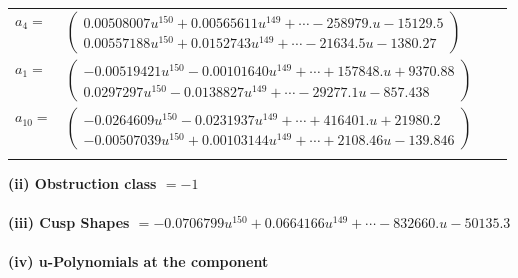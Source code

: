 \documentclass[1p]{elsarticle_modified}
\theoremstyle{definition}
\begin{document}
\begin{tabular}{m{7pt} m{180pt} m{7pt} m{180pt} }
\flushright $a_{4}=$&$\begin{pmatrix}0.00508007 u^{150}+0.00565611 u^{149}+\cdots-258979. u-15129.5\\0.00557188 u^{150}+0.0152743 u^{149}+\cdots-21634.5 u-1380.27\end{pmatrix}$ \\
\flushright $a_{1}=$&$\begin{pmatrix}-0.00519421 u^{150}-0.00101640 u^{149}+\cdots+157848. u+9370.88\\0.0297297 u^{150}-0.0138827 u^{149}+\cdots-29277.1 u-857.438\end{pmatrix}$ \\
\flushright $a_{10}=$&$\begin{pmatrix}-0.0264609 u^{150}-0.0231937 u^{149}+\cdots+416401. u+21980.2\\-0.00507039 u^{150}+0.00103144 u^{149}+\cdots+2108.46 u-139.846\end{pmatrix}$\\&\end{tabular}
\flushleft \textbf{(ii) Obstruction class $= -1$}\\~\\
\flushleft \textbf{(iii) Cusp Shapes $= -0.0706799 u^{150}+0.0664166 u^{149}+\cdots-832660. u-50135.3$}\\~\\
\newpage\renewcommand{\arraystretch}{1}
\flushleft \textbf{(iv) u-Polynomials at the component}\newline \\
\end{document}
